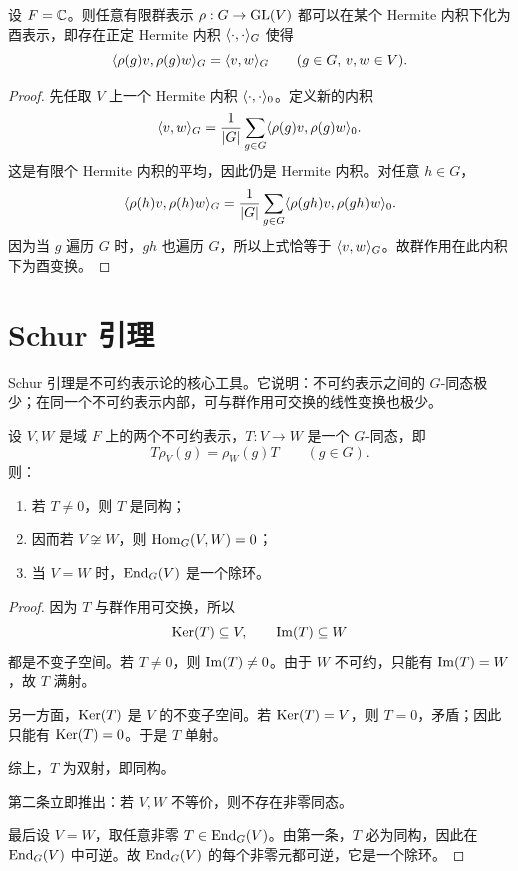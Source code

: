 \begin{proposition}
设 $F=\mathbb{C}$。则任意有限群表示 $\rho:G\to \mathrm{GL}(V)$ 都可以在某个 Hermite 内积下化为酉表示，即存在正定 Hermite 内积 $\langle \cdot, \cdot \rangle_G$ 使得
\[
\langle \rho(g)v, \rho(g)w \rangle_G=\langle v, w \rangle_G
\qquad (g\in G,\,v,w\in V).
\]
\end{proposition}

\begin{proof}
先任取 $V$ 上一个 Hermite 内积 $\langle \cdot, \cdot \rangle_0$。定义新的内积
\[
\langle v, w \rangle_G=\frac{1}{|G|}\sum_{g\in G}\langle \rho(g)v, \rho(g)w \rangle_0.
\]
这是有限个 Hermite 内积的平均，因此仍是 Hermite 内积。对任意 $h\in G$，
\[
\langle \rho(h)v, \rho(h)w \rangle_G
=\frac{1}{|G|}\sum_{g\in G}\langle \rho(gh)v, \rho(gh)w \rangle_0.
\]
因为当 $g$ 遍历 $G$ 时，$gh$ 也遍历 $G$，所以上式恰等于 $\langle v, w \rangle_G$。故群作用在此内积下为酉变换。
\end{proof}

\section{Schur 引理}

Schur 引理是不可约表示论的核心工具。它说明：不可约表示之间的 $G$-同态极少；在同一个不可约表示内部，可与群作用可交换的线性变换也极少。

\begin{theorem}[Schur 引理]
设 $V,W$ 是域 $F$ 上的两个不可约表示，$T:V\to W$ 是一个 $G$-同态，即
\[
T\rho_V(g)=\rho_W(g)T\qquad (g\in G).
\]
则：
\begin{enumerate}[label=\textnormal{(\arabic*)}]
  \item 若 $T\neq 0$，则 $T$ 是同构；
  \item 因而若 $V\not\cong W$，则 $\mathrm{Hom}_G(V,W)=0$；
  \item 当 $V=W$ 时，$\mathrm{End}_G(V)$ 是一个除环。
\end{enumerate}
\end{theorem}

\begin{proof}
因为 $T$ 与群作用可交换，所以
\[
\mathrm{Ker}(T)\subseteq V,\qquad \mathrm{Im}(T)\subseteq W
\]
都是不变子空间。若 $T\neq 0$，则 $\mathrm{Im}(T)\neq 0$。由于 $W$ 不可约，只能有 $\mathrm{Im}(T)=W$，故 $T$ 满射。

另一方面，$\mathrm{Ker}(T)$ 是 $V$ 的不变子空间。若 $\mathrm{Ker}(T)=V$，则 $T=0$，矛盾；因此只能有 $\mathrm{Ker}(T)=0$。于是 $T$ 单射。

综上，$T$ 为双射，即同构。

第二条立即推出：若 $V,W$ 不等价，则不存在非零同态。

最后设 $V=W$，取任意非零 $T\in \mathrm{End}_G(V)$。由第一条，$T$ 必为同构，因此在 $\mathrm{End}_G(V)$ 中可逆。故 $\mathrm{End}_G(V)$ 的每个非零元都可逆，它是一个除环。
\end{proof}

